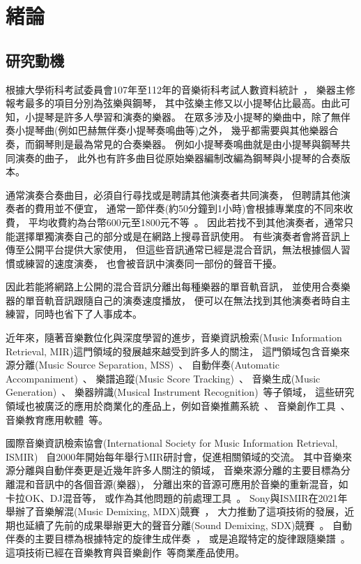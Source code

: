 \documentclass[class=NCU_thesis, crop=false]{standalone}
\begin{document}
\chapter{緒論}
\section{研究動機}

根據大學術科考試委員會107年至112年的音樂術科考試人數資料統計~\cite{CAPE2024Statistics}，
樂器主修報考最多的項目分別為弦樂與鋼琴，
其中弦樂主修又以小提琴佔比最高。由此可知，小提琴是許多人學習和演奏的樂器。
在眾多涉及小提琴的樂曲中，除了無伴奏小提琴曲(例如巴赫無伴奏小提琴奏鳴曲等)之外，
幾乎都需要與其他樂器合奏，而鋼琴則是最為常見的合奏樂器。
例如小提琴奏鳴曲就是由小提琴與鋼琴共同演奏的曲子，
此外也有許多曲目從原始樂器編制改編為鋼琴與小提琴的合奏版本。

通常演奏合奏曲目，必須自行尋找或是聘請其他演奏者共同演奏，
但聘請其他演奏者的費用並不便宜，
通常一節伴奏(約50分鐘到1小時)會根據專業度的不同來收費，
平均收費約為台幣600元至1800元不等~\cite{2020PianoAccompanistHourlySalary}。
因此若找不到其他演奏者，通常只能選擇單獨演奏自己的部分或是在網路上搜尋音訊使用。
有些演奏者會將音訊上傳至公開平台提供大家使用，
但這些音訊通常已經是混合音訊，無法根據個人習慣或練習的速度演奏，
也會被音訊中演奏同一部份的聲音干擾。

因此若能將網路上公開的混合音訊分離出每種樂器的單音軌音訊，
並使用合奏樂器的單音軌音訊跟隨自己的演奏速度播放，
便可以在無法找到其他演奏者時自主練習，同時也省下了人事成本。

近年來，隨著音樂數位化與深度學習的進步，音樂資訊檢索(Music Information Retrieval, MIR)這門領域的發展越來越受到許多人的關注，
這門領域包含音樂來源分離(Music Source Separation, MSS)~\cite{défossez2021music, Cano2019Musical, Rafii2018Overview}、
自動伴奏(Automatic Accompaniment)~\cite{davies2007towards, li2020application, zhang2023design}、
樂譜追蹤(Music Score Tracking)~\cite{orio2003score, dorfer2016towards}、
音樂生成(Music Generation)~\cite{ji2020comprehensive, hernandez2022music}、
樂器辨識(Musical Instrument Recognition)~\cite{solanki2022music, racharla2020predominant, manilow2020hierarchical}等子領域，
這些研究領域也被廣泛的應用於商業化的產品上，例如音樂推薦系統~\cite{Mangla2023Spotify}、
音樂創作工具~\cite{Ableton2024Ableton11, Apple2024LogicPro, PreSonus2024StudioOne}、
音樂教育應用軟體~\cite{Ronimusic2024Amazing, FORSCORE2024forScore}等。

國際音樂資訊檢索協會(International Society for Music Information Retrieval, ISMIR)~\cite{ISMIR2024InternationalSociety}
自2000年開始每年舉行MIR研討會，促進相關領域的交流。
其中音樂來源分離與自動伴奏更是近幾年許多人關注的領域，
音樂來源分離的主要目標為分離混和音訊中的各個音源(樂器)，
分離出來的音源可應用於音樂的重新混音，如卡拉OK、DJ混音等，
或作為其他問題的前處理工具~\cite{zhao2022research}。
Sony與ISMIR在2021年舉辦了音樂解混(Music Demixing, MDX)競賽~\cite{Yuki_Mitsufuji2021MusicDemixing}，
大力推動了這項技術的發展，近期也延續了先前的成果舉辦更大的聲音分離(Sound Demixing, SDX)競賽~\cite{Fabbro_Giorgio2023TheSoundDemixing}。
自動伴奏的主要目標為根據特定的旋律生成伴奏~\cite{wang2022songdriver, ding2023museflow}，
或是追蹤特定的旋律跟隨樂譜~\cite{brazier2021improving}。
這項技術已經在音樂教育與音樂創作~\cite{Antescofo2024metronautapp}等商業產品使用。
\end{document}
